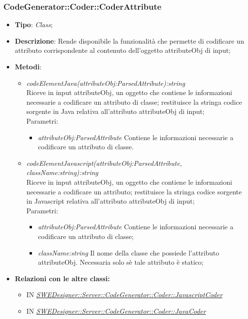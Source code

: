 \documentclass[../DefinizioneDiProdotto.tex]{subfiles}
\begin{document}
			
			\subsubsection{CodeGenerator::Coder::CoderAttribute}
			\hypertarget{SWEDesigner::Server::CodeGenerator::Coder::CoderAttribute}{}
			\begin{itemize}
				\item \textbf{Tipo}: \emph{Class};
				\item \textbf{Descrizione}: Rende disponibile la funzionalità che permette di codificare un attributo corrispondente al contenuto dell'oggetto attributeObj di input;\\
				\item \textbf{Metodi}:
				\begin{itemize}
					\item \emph{codeElementJava(attributeObj:ParsedAttribute):string} \\ 
					Riceve in input attributeObj, un oggetto che contiene le informazioni necessarie a codificare un attributo di classe; 
					restituisce la stringa codice sorgente in Java relativa all'attributo attributeObj di input; \\
					Parametri:
					\begin{itemize}
						\item \emph{attributeObj:ParsedAttribute} Contiene le informazioni necessarie a codificare un attributo di classe.
					\end{itemize}
					
					
					
					\item \emph{codeElementJavascript(attributeObj:ParsedAttribute, className:string):string} \\ 
					Riceve in input attributeObj, un oggetto che contiene le informazioni necessarie a codificare un attributo; 
					restituisce la stringa codice sorgente in Javascript relativa all'attributo attributeObj di input; \\
					Parametri:
					\begin{itemize}
						\item \emph{attributeObj:ParsedAttribute} Contiene le informazioni necessarie a codificare un attributo di classe;
						\item \emph{className:string} Il nome della classe che possiede l'attributo attributeObj. Necessaria solo sè tale attributo è statico;
					\end{itemize}
				\end{itemize}
				
				\item \textbf{Relazioni con le altre classi:}
				\begin{itemize}
					\item IN \hyperlink{SWEDesigner::Server::CodeGenerator::Coder::JavascriptCoder}{\emph{SWEDesigner::Server::CodeGenerator::Coder::JavascriptCoder}}
					\item IN \hyperlink{SWEDesigner::Server::CodeGenerator::Coder::JavaCoder}{\emph{SWEDesigner::Server::CodeGenerator::Coder::JavaCoder}}
				\end{itemize}	
			\end{itemize}
			
\end{document}
